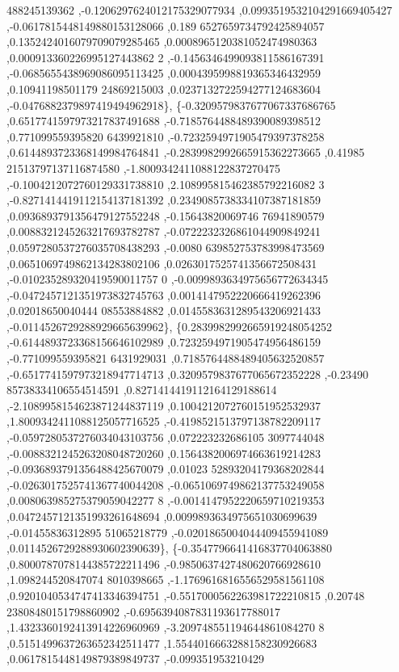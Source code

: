 \begin{DoxyCode}
      488245139362 ,-0.1206297624012175329077934 ,0.0993519532104291669405427 ,-0.0617815448149880153128066 ,0.189
      6527659734792425894057 ,0.1352424016079709079285465 ,0.0008965120381052474980363 ,0.000913360226995127443862
      2 ,-0.1456346499093811586167391 ,-0.0685655438969086095113425 ,0.0004395998819365346432959 ,0.10941198501179
      24869215003 ,0.0237132722594277124683604 ,-0.0476882379897419494962918\},
\{-0.3209579837677067337686765 ,0.6517741597973217837491688 ,-0.7185764488489390089398512 ,0.771099559395820
      6439921810 ,-0.7232594971905479397378258 ,0.6144893723368149984764841 ,-0.2839982992665915362273665 ,0.41985
      21513797137116874580 ,-1.8009342411088122837270475 ,-0.1004212072760129331738810 ,2.108995815462385792216082
      3 ,-0.8271414419112154137181392 ,0.2349085738334107387181859 ,0.0936893791356479127552248 ,-0.15643820069746
      76941890579 ,0.0088321245263217693782787 ,-0.0722232326861044909849241 ,0.0597280537276035708438293 ,-0.0080
      639852753783998473569 ,0.0651069749862134283802106 ,0.0263017525741356672508431 ,-0.010235289320419590011757
      0 ,-0.0099893634975656772634345 ,-0.0472457121351973832745763 ,0.0014147952220666419262396 ,0.02018650040444
      08553884882 ,0.0145583631289543206921433 ,-0.0114526729288929665639962\},
\{0.2839982992665919248054252 ,-0.6144893723368156646102989 ,0.7232594971905474956486159 ,-0.771099559395821
      6431929031 ,0.7185764488489405632520857 ,-0.6517741597973218947714713 ,0.3209579837677065672352228 ,-0.23490
      85738334106554514591 ,0.8271414419112164129188614 ,-2.1089958154623871244837119 ,0.1004212072760151952532937
       ,1.8009342411088125057716525 ,-0.4198521513797138782209117 ,-0.0597280537276034043103756 ,0.072223232686105
      3097744048 ,-0.0088321245263208048720260 ,0.1564382006974663619214283 ,-0.0936893791356488425670079 ,0.01023
      52893204179368202844 ,-0.0263017525741367740044208 ,-0.0651069749862137753249058 ,0.008063985275379059042277
      8 ,-0.0014147952220659710219353 ,0.0472457121351993261648694 ,0.0099893634975651030699639 ,-0.01455836312895
      51065218779 ,-0.0201865004044409455941089 ,0.0114526729288930602390639\},
\{-0.3547796641416837704063880 ,0.8000787078144385722211496 ,-0.9850637427480620766928610 ,1.098244520847074
      8010398665 ,-1.1769616816556529581561108 ,0.9201040534747413346394751 ,-0.5517000562263981722210815 ,0.20748
      23808480151798860902 ,-0.6956394087831193617788017 ,1.4323360192413914226960969 ,-3.209748551194644861084270
      8 ,0.5151499637263652342511477 ,1.5544016663288158230926683 ,0.0617815448149879389849737 ,-0.099351953210429

\end{DoxyCode}
